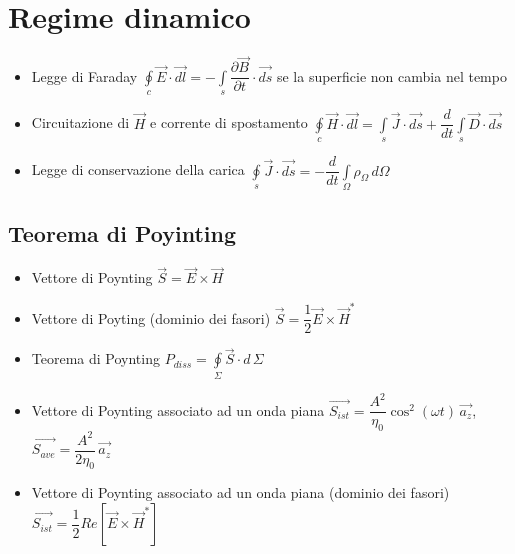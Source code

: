 \documentclass{article}
\begin{document}
\section{Regime dinamico}
\begin{itemize}
	\item Legge di Faraday \(\displaystyle \oint\limits_c \vec{E} \cdot \vec{dl} = - \int\limits_s \dfrac{\partial \vec{B}}{\partial t} \cdot \vec{ds} \) se la superficie non cambia nel tempo
	\item Circuitazione di \( \vec{H} \) e corrente di spostamento \(\displaystyle \oint\limits_c \vec{H} \cdot \vec{dl} = \int\limits_s \vec{J} \cdot \vec{ds} + \dfrac{d}{dt} \int\limits_s \vec{D} \cdot \vec{ds} \)
	\item Legge di conservazione della carica \(\displaystyle \oint\limits_s \vec{J} \cdot \vec{ds} = -\dfrac{d}{dt} \int\limits_\Omega \rho_\Omega \, d\Omega \)
	\end{itemize}
	
\subsection{Teorema di Poyinting}
\begin{itemize}
	\item Vettore di Poynting \( \vec{S} = \vec{E} \times \vec{H} \)
	\item Vettore di Poyting (dominio dei fasori) \( \vec{S} = \dfrac{1}{2} \vec{E} \times \vec{H}^{*} \)
	\item Teorema di Poynting \( P_{diss} = \oint\limits_\Sigma \vec{S} \cdot d \,\Sigma \)
	\item Vettore di Poynting associato ad un onda piana \( \vec{S_{ist}} = \dfrac{A^2}{\eta_0} \cos^2{(\omega t)} \, \vec{a_z} \), \( \vec{S_{ave}} = \dfrac{A^2}{2 \eta_0} \, \vec{a_z}\)
	\item Vettore di Poynting associato ad un onda piana (dominio dei fasori) \( \vec{S_{ist}} = \dfrac{1}{2} Re[\vec{E} \times \vec{H}^{*}] \)
\end{itemize}
\end{document}
